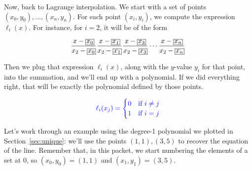 Now, back to Lagrange interpolation. We start with a set of points $(x_0, y_0), 
\ldots,\allowbreak (x_n, y_n)$. For each point $(x_i, y_i)$, we compute the 
expression $\ell_i(x)$. For instance, for $i=2$, it will be of the form

\newcommand{\cyan}[1]{\textcolor{cyan}{#1}}
\[
    \setlength{\fboxsep}{.3\fboxsep}
    \frac{x-\boxed{x_0}}{x_2-\boxed{x_0}}
    \frac{x-\boxed{x_1}}{x_2-\boxed{x_1}}
    \frac{x-\boxed{x_3}}{x_2-\boxed{x_3}}
    \cdots
    \frac{x-\boxed{x_n}}{x_2-\boxed{x_n}}
\]

Then we plug that expression $\ell_i(x)$, along with the $y$-value $y_i$ 
for that point, into the summation, and we'll end up with a polynomial. 
If we did everything right, that will be exactly the polynomial defined 
by those points.


\begin{align*}
    \color{blue}
    \ell_i(x_j) = \begin{cases}
        0 & \text{if $i \neq j$}\\
        1 & \text{if $i=j$}
    \end{cases}
\end{align*}



Let's work through an example using the degree-1 polynomial we plotted in Section~\ref{sec:unique}:
we'll use the points $(1,1), (3,5)$ to recover the equation of the line. Remember that,
in this packet, we start numbering the elements of a set at 0, so $(x_0,y_0)
= (1,1)$ and $(x_1, y_1) = (3,5)$.


